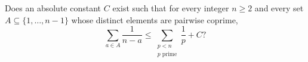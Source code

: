 Does an absolute constant $C$ exist such that for every integer $n\geq2$ and every set $A\subseteq\{1,\ldots,n-1\}$ whose distinct elements are pairwise coprime,
\[\sum_{a\in A}\frac1{n-a}\leq\sum_{\substack{p<n\\p\text{ prime}}}\frac1p+C?\]
